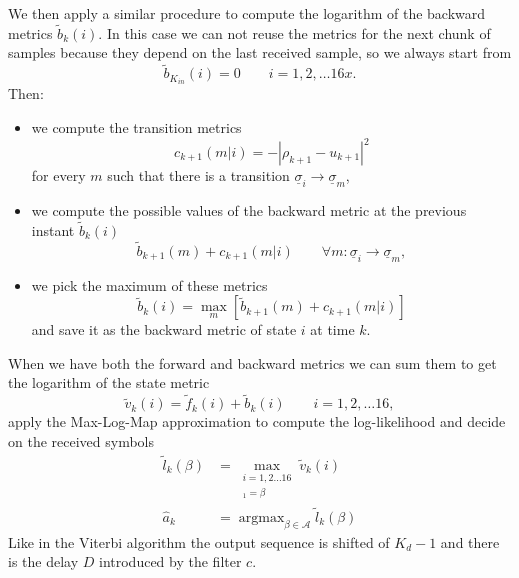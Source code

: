 \documentclass[a4paper,oneside]{article}
\renewcommand{\vec}[1]{\underline{#1}}
\newcommand{\abs}[1]{\left|#1\right|}
\DeclareMathOperator*{\argmax}{argmax}
\newcommand{\vsigma}[0]{\vec{\sigma}}
\begin{document}
We then apply a similar procedure to compute the logarithm of the
backward metrics $\tilde{b}_k(i)$. In this case we can not reuse the
metrics for the next chunk of samples because they depend on the last
received sample, so we always start from
\begin{equation}
  \tilde{b}_{K_{in}}(i) = 0 \qquad i = 1,2,\dots16x .
\end{equation}
Then:
\begin{itemize}
\item we compute the transition metrics
  \begin{equation}
    c_{k+1}(m|i) = -\abs{\rho_{k+1} - u_{k+1}}^2
  \end{equation}
  for every $m$ such that there is a transition $\vsigma_i \rightarrow
  \vsigma_m$,
  \item we compute the possible values of the backward metric at the
    previous instant $\tilde{b}_k(i)$
    \begin{equation}
      \tilde{b}_{k+1}(m) + c_{k+1}(m|i) \qquad \forall m : \vsigma_i
      \rightarrow \vsigma_m ,
    \end{equation}
    \item we pick the maximum of these metrics
    \begin{equation}
       \tilde{b}_{k}(i)  = \max_{m} \left[ \tilde{b}_{k+1}(m) + c_{k+1}(m|i) \right] 
    \end{equation}
    and save it as the backward metric of state $i$ at time $k$.
\end{itemize}

When we have both the forward and backward metrics we can sum them to
get the logarithm of the state metric
\begin{equation}
  \tilde{v}_k(i) = \tilde{f}_k(i) + \tilde{b}_k(i) \qquad i=1,2,\dots16 ,
\end{equation}
apply the Max-Log-Map approximation to compute the log-likelihood and
decide on the received symbols
\begin{align}
  \tilde{l}_k(\beta) &= \max_{\substack{i=1,2\dots16 \\ [\vsigma_i]_1 = \beta}} \tilde{v}_k(i) \\
  \hat{a}_k &= \argmax_{\beta \in \mathcal{A}} \tilde{l}_k(\beta)
\end{align}
Like in the Viterbi algorithm the output sequence is shifted of $K_d
-1$ and there is the delay $D$ introduced by the filter $c$.
\end{document}
